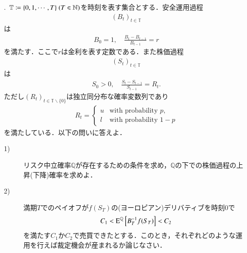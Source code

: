 .\ $\mathbb{T} \coloneqq \{0, 1, \cdots,T\}\ (T \in \N)$を時刻を表す集合とする．安全運用過程
\begin{align}
	(B_t)_{t \in \mathbb{T}}
\end{align}
は
\begin{align}
	B_0 = 1, \quad \frac{B_t - B_{t-1}}{B_{t-1}} = r
\end{align}
を満たす．ここで$r$は金利を表す定数である．また株価過程
\begin{align}
	(S_t)_{t \in \mathbb{T}}
\end{align}
は
\begin{align}
	S_0 > 0, \quad \frac{S_t - S_{t-1}}{S_{t-1}} = R_t.
\end{align}
ただし$(R_t)_{t \in \mathbb{T}\backslash \{0\}}$は独立同分布な確率変数列であり
\begin{align}
	R_t = \begin{cases}
		u & \mbox{with probability } p, \\
		l & \mbox{with probability } 1-p
	\end{cases}
\end{align}
を満たしている．以下の問いに答えよ．
\begin{description}
	\item[1)] リスク中立確率$\mathbb{Q}$が存在するための条件を求め，$\mathbb{Q}$の下での株価過程の上昇(下降)確率を求めよ．
	\item[2)] 満期$T$でのペイオフが$f(S_T)$の(ヨーロピアン)デリバティブを時刻0で
		\begin{align}
			C_1 < \Exp{B_T^{-1}f(S_T)}{}{\mathbb{Q}} < C_2
		\end{align}
		を満たす$C_1$か$C_2$で売買できたとする．このとき，それぞれどのような運用を行えば裁定機会が産まれるか論じなさい．
\end{description}

